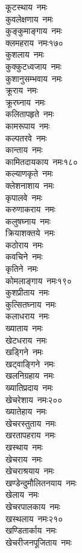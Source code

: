 \begin{multicols}{\maxColumns}
\begin{flushleft}
कूटस्थाय~नमः\\
कुवलेक्षणाय~नमः\\
कुङ्कुमाङ्गाय~नमः\\
क्लमहराय~नमः\hfill १७०\\
कुशलाय~नमः\\
कुक्कुटध्वजाय~नमः\\
कुशानुसम्भवाय~नमः\\
क्रूराय~नमः\\
क्रूरघ्नाय~नमः\\
कलितापहृते~नमः\\
कामरूपाय~नमः\\
कल्पतरवे~नमः\\
कान्ताय~नमः\\
कामितदायकाय~नमः\hfill १८०\\
कल्याणकृते~नमः\\
क्लेशनाशाय~नमः\\
कृपालवे~नमः\\
करुणाकराय~नमः\\
कलुषघ्नाय~नमः\\
क्रियाशक्तये~नमः\\
कठोराय~नमः\\
कवचिने~नमः\\
कृतिने~नमः\\
कोमलाङ्गाय~नमः\hfill १९०\\
कुशप्रीताय~नमः\\
कुत्सितघ्नाय~नमः\\
कलाधराय~नमः\\
ख्याताय~नमः\\
खेटधराय~नमः\\
खड्गिने~नमः\\
खट्वाङ्गिने~नमः\\
खलनिग्रहाय~नमः\\
ख्यातिप्रदाय~नमः\\
खेचरेशाय~नमः\hfill २००\\
ख्यातेहाय~नमः\\
खेचरस्तुताय~नमः\\
खरतापहराय~नमः\\
खस्थाय~नमः\\
खेचराय~नमः\\
खेचराश्रयाय~नमः\\
खण्डेन्दुमौलितनयाय~नमः\\
खेलाय~नमः\\
खेचरपालकाय~नमः\\
खस्थलाय~नमः\hfill २१०\\
खण्डितार्काय~नमः\\
खेचरीजनपूजिताय~नमः\\

\end{flushleft}
\end{multicols}
